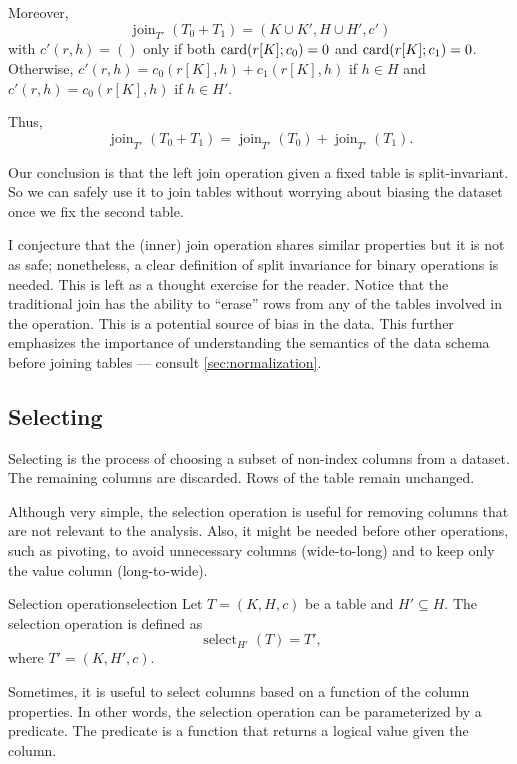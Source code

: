 Moreover, \[
  \operatorname{join}_{T'}(T_0 + T_1) = (K \cup K', H \cup H', c')
\] with $c'(r, h) = ()$ only if both $\rowcard[{r[K]; c_0}] = 0$ and $\rowcard[{r[K];
c_1}] = 0$.  Otherwise, $c'(r, h) = c_0(r[K], h) + c_1(r[K], h)$ if $h \in H$ and $c'(r,
h) = c_0(r[K], h)$ if $h \in H'$.

Thus, \[
  \operatorname{join}_{T'}(T_0 + T_1) = \operatorname{join}_{T'}(T_0) + \operatorname{join}_{T'}(T_1)\text{.}
\]

Our conclusion is that the left join operation given a fixed table is split-invariant.
So we can safely use it to join tables without worrying about biasing the dataset once we
fix the second table.

I conjecture that the (inner) join operation shares similar properties but it is not as
safe; nonetheless, a clear definition of split invariance for binary operations is needed.
This is left as a thought exercise for the reader.  Notice that the traditional join has
the ability to ``erase'' rows from any of the tables involved in the operation.  This is a
potential source of bias in the data.  This further emphasizes the importance of
understanding the semantics of the data schema before joining tables --- consult
\cref{sec:normalization}.

\subsection{Selecting}
\label{sub:selection}

Selecting is the process of choosing a subset of non-index columns from a dataset.  The
remaining columns are discarded.  Rows of the table remain unchanged.

Although very simple, the selection operation is useful for removing columns that are not
relevant to the analysis.  Also, it might be needed before other operations, such as
pivoting, to avoid unnecessary columns (wide-to-long) and to keep only the value column
(long-to-wide).

\begin{defbox}{Selection operation}{selection}
  Let $T = (K, H, c)$ be a table and $H' \subseteq H$.  The selection operation is
  defined as \[
    \operatorname{select}_{H'}(T) = T'\text{,}
  \] where $T' = (K, H', c)$.
\end{defbox}

Sometimes, it is useful to select columns based on a function of the column properties.
In other words, the selection operation can be parameterized by a predicate.  The predicate
is a function that returns a logical value given the column.

